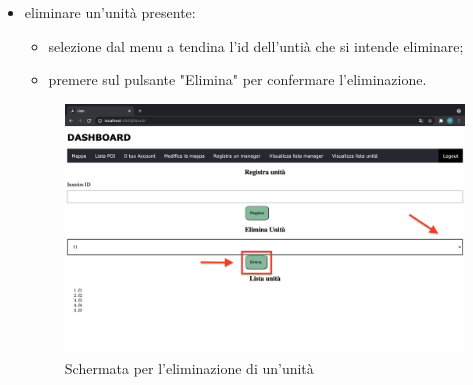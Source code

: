 \begin{itemize}
\begin{figure}[H]
    \end{figure}
    \item eliminare un'unità presente: 
    \begin{itemize}
        \item selezione dal menu a tendina l'id dell'untià che si intende eliminare;
        \item premere sul pulsante "Elimina" per confermare l'eliminazione.
    \end{itemize}
    \begin{figure}[H]
        \centering
        \includegraphics[scale=0.12]{res/images/eliminaunita.png}
        \caption{Schermata per l'eliminazione di un'unità}
    \end{figure}
\end{itemize}
